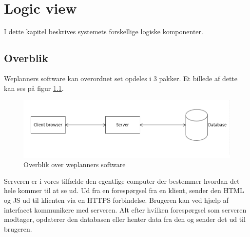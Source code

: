 \chapter{Logic view}
I dette kapitel beskrives systemets forskellige logiske komponenter.

\section{Overblik}
Weplanners software kan overordnet set opdeles i 3 pakker. Et billede af dette kan ses på figur \ref{fig:Weplanner_overview}.  


\begin{figure}[H]
    \centering
    \includegraphics[scale=0.5]{05_Arkitektur/Images/LogicView.png}
    \caption{Overblik over weplanners software}
    \label{fig:Weplanner_overview}
\end{figure}

Serveren er i vores tilfælde den egentlige computer der bestemmer hvordan det hele kommer til at se ud. Ud fra en forespørgsel fra en klient, sender den HTML og JS ud til klienten via en HTTPS forbindelse. Brugeren kan ved hjælp af interfacet kommunikere med serveren. Alt efter hvilken forespørgsel som serveren modtager, opdaterer den databasen eller henter data fra den og sender det ud til brugeren.

